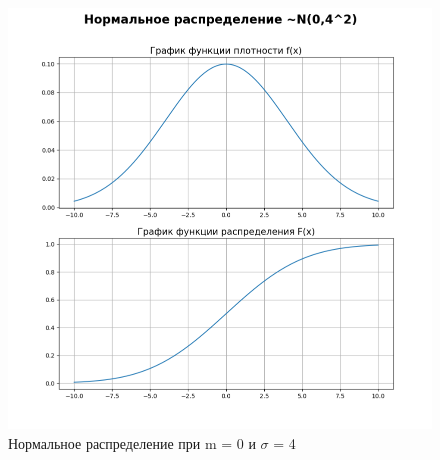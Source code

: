 \clearpage

\begin{figure}[ht!]
	\centering
	\includegraphics[width=0.8\linewidth]{img/n3.png}
	\caption{Нормальное распределение при m = 0 и $\sigma$ = 4}
	\label{ex:n3}
\end{figure}
